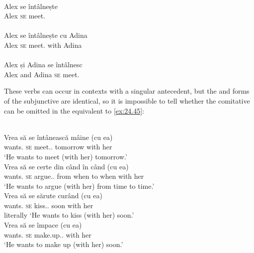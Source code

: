 \documentclass[output=paper]{langsci/langscibook}
\begin{document}
\ea%
    \label{ex:24.42}\\
	\gll \llap{*}Alex     se   întâlnește\\
		Alex     \textsc{se}   meet.\Tsg{}\\
\ex%
    \label{ex:24.43}\\
	\gll Alex     se   întâlnește   cu   Adina\\
		Alex     \textsc{se}   meet.\Tsg{}  with  Adina\\
\ex%
    \label{ex:24.44}\\
	\gll Alex și Adina   se   întâlnesc\\
		Alex and Adina   \textsc{se}   meet.\Tpl{}\\
\z

These verbs can occur in  contexts with a singular antecedent, but the
\Tsg{} and \Tpl{} forms of the subjunctive are identical, so it is impossible
to tell whether the comitative can be omitted in the equivalent to \eqref{ex:24.45}:\largerpage

\ea%
    \label{ex:24.45}\\
	\gll Vrea    să   se   întânească    mâine     (cu   ea)\\
    wants.\Tsg{} \Sbjv{}   \textsc{se}   meet.\Sbjv{}.\Third{}   tomorrow \hphantom{(}with   her\\
	\glt ‘He wants to meet (with her) tomorrow.’
\ex%
    \label{ex:24.46}\\
	\gll Vrea     să   se   certe     din   când   în   când   (cu   ea)\\
    wants.\Tsg{} \Sbjv{}   \textsc{se}   argue.\Sbjv{}.\Third{}   from   when to   when  \hphantom{(}with   her\\
	\glt ‘He wants to argue (with her) from time to time.’
\ex%
    \label{ex:24.47}\\
	\gll Vrea    să   se   sărute       curând     (cu   ea)\\
    wants.\Tsg{} \Sbjv{}   \textsc{se}   kiss.\Sbjv{}.\Third{}      soon \hphantom{(}with   her\\
	\glt literally ‘He wants to kiss (with her) soon.’
\ex%
    \label{ex:24.48}\\
	\gll Vrea   să   se   împace     (cu   ea)\\
    wants.\Tsg{} \Sbjv{}   \textsc{se}   make.up.\Sbjv{}.\Third{}  \hphantom{(}with  her\\
	\glt ‘He wants to make up (with her) soon.’
\z
\end{document}
